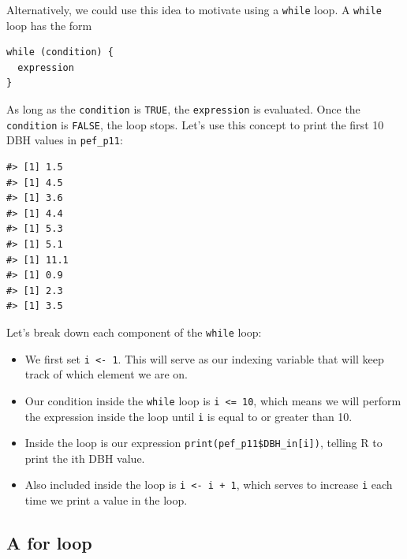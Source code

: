 \documentclass[
  11pt,
]{krantz}
\newenvironment{Shaded}{\begin{snugshade}}{\end{snugshade}}
\newcommand{\ControlFlowTok}[1]{\textcolor[rgb]{0.13,0.29,0.53}{\textbf{#1}}}
\newcommand{\DecValTok}[1]{\textcolor[rgb]{0.00,0.00,0.81}{#1}}
\newcommand{\KeywordTok}[1]{\textcolor[rgb]{0.13,0.29,0.53}{\textbf{#1}}}
\newcommand{\NormalTok}[1]{#1}
\newcommand{\OperatorTok}[1]{\textcolor[rgb]{0.81,0.36,0.00}{\textbf{#1}}}
\newcommand{\StringTok}[1]{\textcolor[rgb]{0.31,0.60,0.02}{#1}}
\providecommand{\tightlist}{%
  \setlength{\itemsep}{0pt}\setlength{\parskip}{0pt}}
\theoremstyle{definition}
\theoremstyle{definition}
\theoremstyle{definition}
\theoremstyle{definition}
\theoremstyle{remark}
\begin{document}
Alternatively, we could use this idea to motivate using a \texttt{while} loop. A \texttt{while} loop has the form

\begin{verbatim}
while (condition) {
  expression
}
\end{verbatim}

As long as the \texttt{condition} is \texttt{TRUE}, the \texttt{expression} is evaluated. Once the \texttt{condition} is \texttt{FALSE}, the loop stops. Let's use this concept to print the first 10 DBH values in \texttt{pef\_p11}:

\begin{Shaded}
\end{Shaded}

\begin{verbatim}
#> [1] 1.5
#> [1] 4.5
#> [1] 3.6
#> [1] 4.4
#> [1] 5.3
#> [1] 5.1
#> [1] 11.1
#> [1] 0.9
#> [1] 2.3
#> [1] 3.5
\end{verbatim}

Let's break down each component of the \texttt{while} loop:

\begin{itemize}
\tightlist
\item
  We first set \texttt{i\ \textless{}-\ 1}. This will serve as our indexing variable that will keep track of which element we are on.
\item
  Our condition inside the \texttt{while} loop is \texttt{i\ \textless{}=\ 10}, which means we will perform the expression inside the loop until \texttt{i} is equal to or greater than 10.
\item
  Inside the loop is our expression \texttt{print(pef\_p11\$DBH\_in{[}i{]})}, telling R to print the ith DBH value.
\item
  Also included inside the loop is \texttt{i\ \textless{}-\ i\ +\ 1}, which serves to increase \texttt{i} each time we print a value in the loop.
\end{itemize}

\hypertarget{forLoops}{%
\subsection{A for loop}\label{forLoops}}
\end{document}
